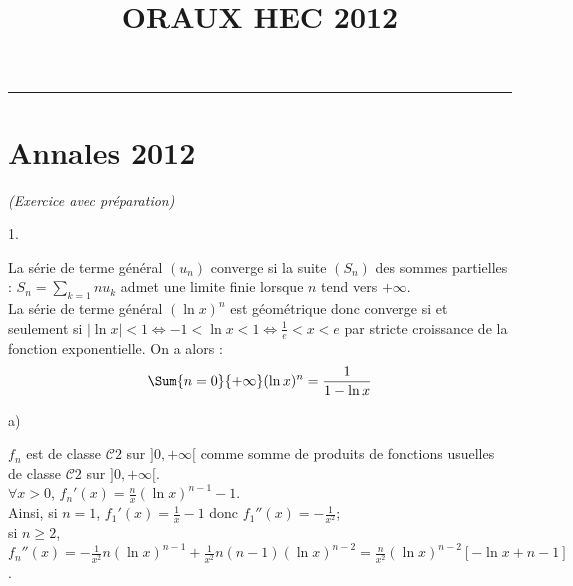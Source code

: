 \documentclass[11pt]{article}%
\title{\bf \vspace{-1cm} ORAUX HEC 2012} %
\author{} %
\date{} %
\begin{document}
\maketitle %
\vspace{-1.2cm}\hrule %
\thispagestyle{fancy}

\vspace*{.4cm}


\section{Annales 2012}
 

 \begin{exercice}{\it (Exercice avec préparation)}~
 \begin{noliste}{1.}
 \setlength{\itemsep}{4mm}
 \item La série de terme général $(u_{n})$ converge si la suite
$(S_{n})$ des sommes partielles : $S_{n} = \sum \limits_{k = 1}{n}
u_{k}$ admet une limite finie lorsque $n$ tend vers $ + \infty$.\\
 La série de terme général $(\ln x)^{n}$ est géométrique donc converge
si et seulement si $|\ln x|<1 \Leftrightarrow -1< \ln x < 1
\Leftrightarrow \frac{1}{e} < x < e$ par stricte croissance de la
fonction exponentielle. On a alors : \\
 
\[
 \Sum{n = 0}{+ \infty} (\ln x)^{n} = \frac{1 }{1-\ln x}
\] 

 \item 
 \begin{noliste}{a)}
 \setlength{\itemsep}{2mm}
 \item $f_{n}$ est de classe $\mathcal{C}{2}$ sur $]0, + \infty[$ comme
somme de produits de fonctions usuelles de classe $\mathcal{C}{2}$ sur
$]0, + \infty[$.\\
 $\forall x > 0$, $f_{n}{'}(x) = \frac{n}{x}(\ln x)^{n-1}-1$.\\
 Ainsi, si $n = 1$, $f_{1}{'}(x) = \frac{1}{x}-1$ donc $f_{1}{''}(x) =
-\frac{1}{x^{2}}$; \\
 si $n \geq 2$, $f_{n}{''}(x) = -\frac{1}{x^{2}} n (\ln x) ^{n-1} +
\frac{1}{x^{2}} n (n-1) (\ln x)^{n-2} = \frac{n}{x^{2}} (\ln
x)^{n-2}[-\ln x + n-1]$.
\item \noindent

  \begin{center}
  \end{center}


\end{noliste}
\end{noliste}
\end{exercice}
\end{document}
